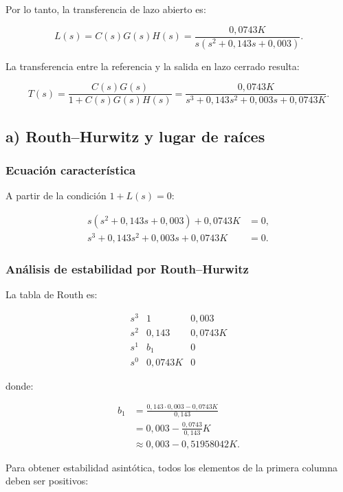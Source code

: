 \documentclass[12pt,a4paper]{article}
\begin{document}
Por lo tanto, la transferencia de lazo abierto es:

\[
\boxed{
L(s)
=
C(s)G(s)H(s)
=
\frac{0{,}0743K}
{s(s^2+0{,}143s+0{,}003)}.
}
\]

La transferencia entre la referencia y la salida
en lazo cerrado resulta:

\[
T(s)
=
\frac{C(s)G(s)}
{1+C(s)G(s)H(s)}
=
\frac{0{,}0743K}
{s^3+0{,}143s^2+0{,}003s+0{,}0743K}.
\]



\subsection*{a) Routh--Hurwitz y lugar de raíces}


\subsubsection*{Ecuación característica}

A partir de la condición $1+L(s)=0$:

\begin{align*}
s(s^2+0{,}143s+0{,}003)+0{,}0743K&=0,\\
s^3+0{,}143s^2+0{,}003s+0{,}0743K&=0.
\end{align*}


\subsubsection*{Análisis de estabilidad por Routh--Hurwitz}

La tabla de Routh es:

\[
\begin{array}{c|cc}
s^3 & 1 & 0{,}003\\
s^2 & 0{,}143 & 0{,}0743K\\
s^1 & b_1 & 0\\
s^0 & 0{,}0743K & 0
\end{array}
\]

donde:

\begin{align*}
b_1
&=
\frac{
0{,}143\cdot0{,}003-0{,}0743K
}{
0{,}143
}\\
&=
0{,}003-\frac{0{,}0743}{0{,}143}K\\
&\approx
0{,}003-0{,}51958042K.
\end{align*}

Para obtener estabilidad asintótica, todos los elementos
de la primera columna deben ser positivos:
\end{document}
